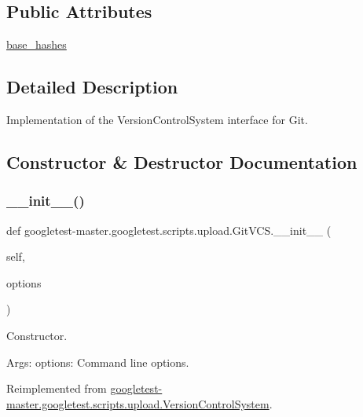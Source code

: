 \subsection*{Public Attributes}
\begin{DoxyCompactItemize}
\item 
\mbox{\hyperlink{classgoogletest-master_1_1googletest_1_1scripts_1_1upload_1_1_git_v_c_s_a1f98db3073e5ef9096b2da85aa86fa34}{base\+\_\+hashes}}
\end{DoxyCompactItemize}


\subsection{Detailed Description}
\begin{DoxyVerb}Implementation of the VersionControlSystem interface for Git.\end{DoxyVerb}
 

\subsection{Constructor \& Destructor Documentation}
\mbox{\label{classgoogletest-master_1_1googletest_1_1scripts_1_1upload_1_1_git_v_c_s_a3ccc3d3f7f2cbbbfd6b67243bfa71d74}} 
\subsubsection{\texorpdfstring{\_\_init\_\_()}{\_\_init\_\_()}}
{\footnotesize\ttfamily def googletest-\/master.\+googletest.\+scripts.\+upload.\+Git\+V\+C\+S.\+\_\+\+\_\+init\+\_\+\+\_\+ (\begin{DoxyParamCaption}\item[{}]{self,  }\item[{}]{options }\end{DoxyParamCaption})}

\begin{DoxyVerb}Constructor.

Args:
  options: Command line options.
\end{DoxyVerb}
 

Reimplemented from \mbox{\hyperlink{classgoogletest-master_1_1googletest_1_1scripts_1_1upload_1_1_version_control_system_a28c02d45c4bd32f9750090e1eda733a3}{googletest-\/master.\+googletest.\+scripts.\+upload.\+Version\+Control\+System}}.



